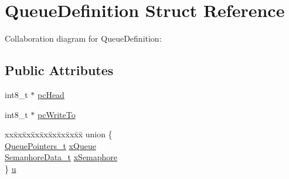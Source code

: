 \hypertarget{struct_queue_definition}{}\section{Queue\+Definition Struct Reference}
\label{struct_queue_definition}


Collaboration diagram for Queue\+Definition\+:
\subsection*{Public Attributes}
\begin{DoxyCompactItemize}
\item 
int8\+\_\+t $\ast$ \hyperlink{struct_queue_definition_a1c8f1f3ca9262063902bbdd40c37bc65}{pc\+Head}
\item 
int8\+\_\+t $\ast$ \hyperlink{struct_queue_definition_a724035e62425ba44001f7589091cacfd}{pc\+Write\+To}
\item 
\begin{tabbing}
xx\=xx\=xx\=xx\=xx\=xx\=xx\=xx\=xx\=\kill
union \{\\
\>\hyperlink{externals_2freertos_2queue_8c_ad04ba6edfecdbdee6406cdd62a72671c}{QueuePointers\_t} \hyperlink{struct_queue_definition_aea4a2daf33054ff6b535f158bd4007f0}{xQueue}\\
\>\hyperlink{externals_2freertos_2queue_8c_a37643b46fd5893e70242848a22aef310}{SemaphoreData\_t} \hyperlink{struct_queue_definition_adb2c0818274974553c619ff953b6f477}{xSemaphore}\\
\} \hyperlink{struct_queue_definition_afb6a8d505482cddf8375af6232cd5a77}{u}\\


\end{tabbing}
\end{DoxyCompactItemize}
